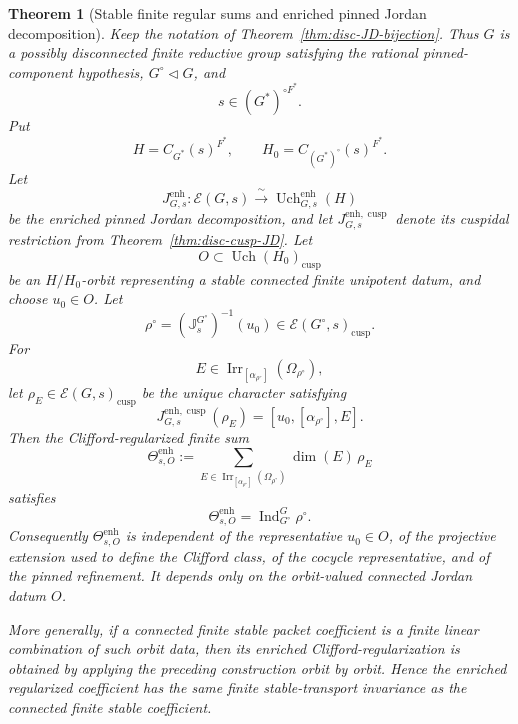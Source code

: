 \documentclass{amsart}
\theoremstyle{plain}
\numberwithin{equation}{section}
\newtheorem{theorem}{Theorem}[section]
\theoremstyle{definition}
\renewcommand{\dim}{\operatorname{dim}}
\newcommand{\cE}{\mathcal{E}}
\newcommand{\Ind}{\operatorname{Ind}}
\newcommand{\Irr}{\operatorname{Irr}}
\newcommand{\Uch}{\operatorname{Uch}}
\newcommand{\J}{\mathbb{J}}
\newcommand{\cusp}{\operatorname{cusp}}
\begin{document}
\begin{theorem}[Stable finite regular sums and enriched pinned Jordan decomposition]
\label{thm:pinned-JD-stable-sum-compatible}
Keep the notation of Theorem~\ref{thm:disc-JD-bijection}.  Thus \(G\) is a
possibly disconnected finite reductive group satisfying the rational
pinned-component hypothesis, \(G^\circ\lhd G\), and
\[
        s\in (G^*)^{\circ F^*}.
\]
Put
\[
        H=C_{G^*}(s)^{F^*},
        \qquad
        H_0=C_{(G^*)^\circ}(s)^{F^*}.
\]
Let
\[
        J^{\mathrm{enh}}_{G,s}:
        \cE(G,s)
        \xrightarrow{\ \sim\ }
        \Uch^{\mathrm{enh}}_{G,s}(H)
\]
be the enriched pinned Jordan decomposition, and let
\(J^{\mathrm{enh},\cusp}_{G,s}\) denote its cuspidal restriction from
Theorem~\ref{thm:disc-cusp-JD}.  Let
\[
        O\subset \Uch(H_0)_{\cusp}
\]
be an \(H/H_0\)-orbit representing a stable connected finite unipotent datum,
and choose \(u_0\in O\).  Let
\[
        \rho^\circ=(\J_s^{G^\circ})^{-1}(u_0)
        \in \cE(G^\circ,s)_{\cusp}.
\]
For
\[
        E\in\Irr_{[\alpha_{\rho^\circ}]}(\Omega_{\rho^\circ}),
\]
let \(\rho_E\in\cE(G,s)_{\cusp}\) be the unique character satisfying
\[
        J^{\mathrm{enh},\cusp}_{G,s}(\rho_E)
        =
        [u_0,[\alpha_{\rho^\circ}],E].
\]
Then the Clifford-regularized finite sum
\[
        \Theta^{\mathrm{enh}}_{s,O}
        :=
        \sum_{E\in\Irr_{[\alpha_{\rho^\circ}]}(\Omega_{\rho^\circ})}
        \dim(E)\,\rho_E
\]
satisfies
\[
        \Theta^{\mathrm{enh}}_{s,O}
        =
        \Ind_{G^\circ}^{G}\rho^\circ .
\]
Consequently \(\Theta^{\mathrm{enh}}_{s,O}\) is independent of the representative
\(u_0\in O\), of the projective extension used to define the Clifford class, of
the cocycle representative, and of the pinned refinement.  It depends only on
the orbit-valued connected Jordan datum \(O\).

More generally, if a connected finite stable packet coefficient is a finite
linear combination of such orbit data, then its enriched Clifford-regularization
is obtained by applying the preceding construction orbit by orbit.  Hence the
enriched regularized coefficient has the same finite stable-transport invariance
as the connected finite stable coefficient.
\end{theorem}
\end{document}
